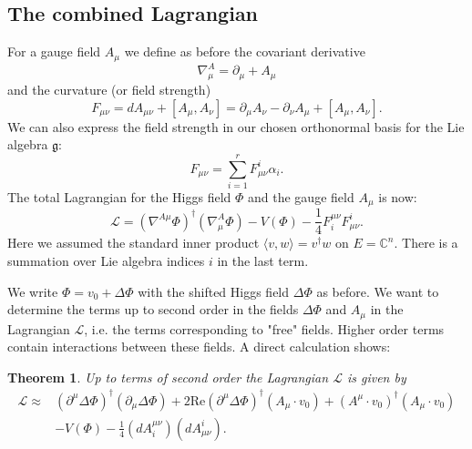 \documentclass[11pt]{amsart}
\newtheorem{thm}{Theorem}[section]
\theoremstyle{definition}
\theoremstyle{remark}
\numberwithin{equation}{section}
\begin{document}
\subsection{The combined Lagrangian}
For a gauge field $A_\mu$ we define as before the covariant derivative 
\begin{equation*}
\nabla_\mu^A=\partial_\mu+A_\mu
\end{equation*}
and the curvature (or field strength)
\begin{equation*}
F_{\mu\nu}=dA_{\mu\nu}+[A_\mu,A_\nu]=\partial_\mu A_\nu-\partial_\nu A_\mu+[A_\mu,A_\nu].
\end{equation*}
We can also express the field strength in our chosen orthonormal basis for the Lie algebra $\mathfrak{g}$:
\begin{equation*}
F_{\mu\nu}=\sum_{i=1}^rF_{\mu\nu}^i\alpha_i.
\end{equation*}
The total Lagrangian for the Higgs field $\Phi$ and the gauge field $A_\mu$ is now:
\begin{equation*}
\mathcal{L}=\left(\nabla^{A\mu}\Phi\right)^\dagger\left(\nabla^A_\mu\Phi\right)-V(\Phi)-\frac{1}{4}F^{\mu\nu}_iF_{\mu\nu}^i.
\end{equation*}
Here we assumed the standard inner product $\langle v,w\rangle=v^\dagger w$ on $E=\mathbb{C}^n$. There is a summation over Lie algebra indices $i$ in the last term.

We write $\Phi=v_0+\Delta\Phi$ with the shifted Higgs field $\Delta\Phi$ as before. We want to determine the terms up to second order in the fields $\Delta\Phi$ and $A_\mu$ in the Lagrangian $\mathcal{L}$, i.e. the terms corresponding to "{}free{}" fields. Higher order terms contain interactions between these fields. A direct calculation shows:
\begin{thm}
Up to terms of second order the Lagrangian $\mathcal{L}$ is given by\begin{align*}
\mathcal{L}\approx&\left(\partial^\mu\Delta\Phi\right)^\dagger\left(\partial_\mu\Delta\Phi\right)+2\mathrm{Re}\left(\partial^\mu\Delta\Phi\right)^\dagger\left(A_\mu\cdot v_0\right)+\left(A^\mu\cdot v_0\right)^\dagger\left(A_\mu\cdot v_0\right)\\
&-V(\Phi)-\frac{1}{4}\left(dA_i^{\mu\nu}\right)\left(dA^i_{\mu\nu}\right).
\end{align*}
\end{thm}
\end{document}
